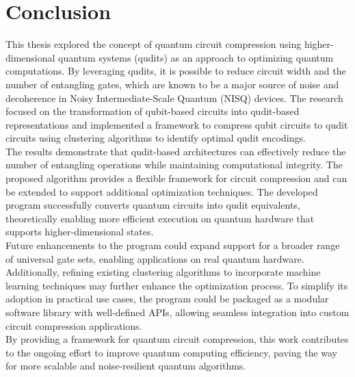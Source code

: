 \chapter{Conclusion} \label{chap:conclusion}
This thesis explored the concept of quantum circuit compression using higher-dimensional quantum systems (qudits) as an approach to optimizing quantum computations. By leveraging qudits, it is possible to reduce circuit width and the number of entangling gates, which are known to be a major source of noise and decoherence in Noisy Intermediate-Scale Quantum (NISQ) devices. The research focused on the transformation of qubit-based circuits into qudit-based representations and implemented a framework to compress qubit circuits to qudit circuits using clustering algorithms to identify optimal qudit encodings.
\\[12pt]
The results demonstrate that qudit-based architectures can effectively reduce the number of entangling operations while maintaining computational integrity. The proposed algorithm provides a flexible framework for circuit compression and can be extended to support additional optimization techniques. The developed program successfully converts quantum circuits into qudit equivalents, theoretically enabling more efficient execution on quantum hardware that supports higher-dimensional states.
\\[12pt]
Future enhancements to the program could expand support for a broader range of universal gate sets, enabling applications on real quantum hardware. Additionally, refining existing clustering algorithms to incorporate machine learning techniques may further enhance the optimization process. To simplify its adoption in practical use cases, the program could be packaged as a modular software library with well-defined APIs, allowing seamless integration into custom circuit compression applications.
\\[12pt]
By providing a framework for quantum circuit compression, this work contributes to the ongoing effort to improve quantum computing efficiency, paving the way for more scalable and noise-resilient quantum algorithms.
